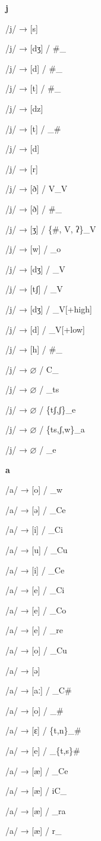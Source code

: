 \begin{center}\textbf{j}\end{center}
\begin{multicols}{4}
\noindent /j/ → [s]

\noindent /j/ → [dʒ] / \#\_

\noindent /j/ → [d] / \#\_

\noindent /j/ → [t] / \#\_

\noindent /j/ → [dz]

\noindent /j/ → [t] / \_\#

\noindent /j/ → [d]

\noindent /j/ → [r]

\noindent /j/ → [ð] / V\_V

\noindent /j/ → [ð] / \#\_

\noindent /j/ → [ʒ] / \{\#, V, ʔ\}\_V

\noindent /j/ → [w] / \_o

\noindent /j/ → [dʒ] / \_V

\noindent /j/ → [tʃ] / \_V

\noindent /j/ → [dʒ] / \_V[+high]

\noindent /j/ → [d] / \_V[+low]

\noindent /j/ → [h] / \#\_

\noindent /j/ → $\varnothing$ / C\_

\noindent /j/ → $\varnothing$ / \_ts

\noindent /j/ → $\varnothing$ / \{tʃ,ʃ\}\_e

\noindent /j/ → $\varnothing$ / \{ts,ʃ,w\}\_a

\noindent /j/ → $\varnothing$ / \_e
\end{multicols}

\begin{center}\textbf{a}\end{center}
\begin{multicols}{4}
\noindent /a/ → [o] / \_w

\noindent /a/ → [ə] / \_Ce

\noindent /a/ → [i] / \_Ci

\noindent /a/ → [u] / \_Cu

\noindent /a/ → [i] / \_Ce

\noindent /a/ → [e] / \_Ci

\noindent /a/ → [e] / \_Co

\noindent /a/ → [e] / \_re

\noindent /a/ → [o] / \_Cu

\noindent /a/ → [ə]

\noindent /a/ → [aː] / \_C\#

\noindent /a/ → [o] / \_\#

\noindent /a/ → [ɛ] / \{t,n\}\_\#

\noindent /a/ → [e] / \_\{t,s\}\#

\noindent /a/ → [æ] / \_Ce

\noindent /a/ → [æ] / iC\_

\noindent /a/ → [æ] / \_ra

\noindent /a/ → [æ] / r\_
\end{multicols}


